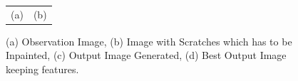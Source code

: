 \documentclass[a4paper, 15pt]{article}
\begin{document}
\begin{figure}[!h]
\begin{tabular}{cc}
			(a) & (b) 
		\end{tabular}
		\caption{(a) Observation Image, (b) Image with Scratches which has to be Inpainted, (c) Output Image Generated, (d) Best Output Image keeping features.}
	\end{figure}	
	\newpage
	
	
\end{document}
